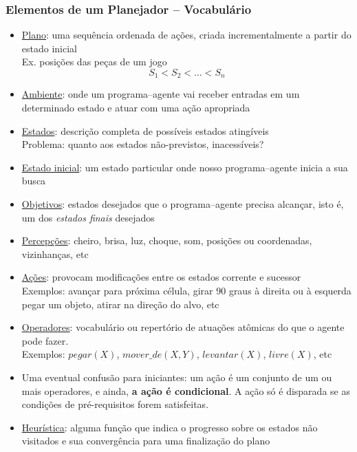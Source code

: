 \begin{frame}[fragile, allowframebreaks=0.9]
\frametitle{Elementos de um  Planejador -- Vocabulário}


\begin{itemize}
 \item \underline{Plano}: uma sequência ordenada de ações, 
 criada incrementalmente a partir do estado inicial\\
Ex. posições das peças de um jogo\\
$$S_1 < S_2 < ... < S_n$$
 
  \item \underline{Ambiente}: onde um programa--agente vai receber entradas em um determinado
  estado e atuar com uma ação apropriada

  \item  \underline{Estados}:   descrição completa de possíveis estados atingíveis\\
  Problema: quanto aos estados não-previstos, inacessíveis?

  \item  \underline{Estado inicial}: um estado particular onde nosso programa--agente
  inicia a sua busca
  
  \item \underline{Objetivos}: estados desejados que o programa--agente precisa alcançar,
  isto é, um dos \textit{estados finais} desejados

  \item  \underline{Percepções}: cheiro, brisa, luz, choque,
  som, posições ou coordenadas, vizinhanças, etc

  \item \underline{Ações}: provocam modificações entre os estados corrente e sucessor\\
  Exemplos: avançar para próxima célula, girar 90 graus à direita ou à esquerda
pegar um objeto, atirar na direção do alvo, etc
 
 \item \underline{Operadores}: vocabulário ou repertório de atuações atômicas do que o agente pode fazer.\\
 Exemplos: $pegar(X)$, $mover\_de(X,Y)$, $levantar(X)$, $livre(X)$, etc
 
 \item Uma eventual confusão para iniciantes: um ação é um conjunto de um ou mais operadores,
 e ainda, \textbf{a ação é condicional}. A ação só é disparada se as condições de pré-requisitos forem 
 satisfeitas.
 
 \item \underline{Heurística}: alguma função que  indica o progresso sobre os estados
 não visitados e sua convergência para uma finalização do plano
 
 
\end{itemize}

\end{frame}




